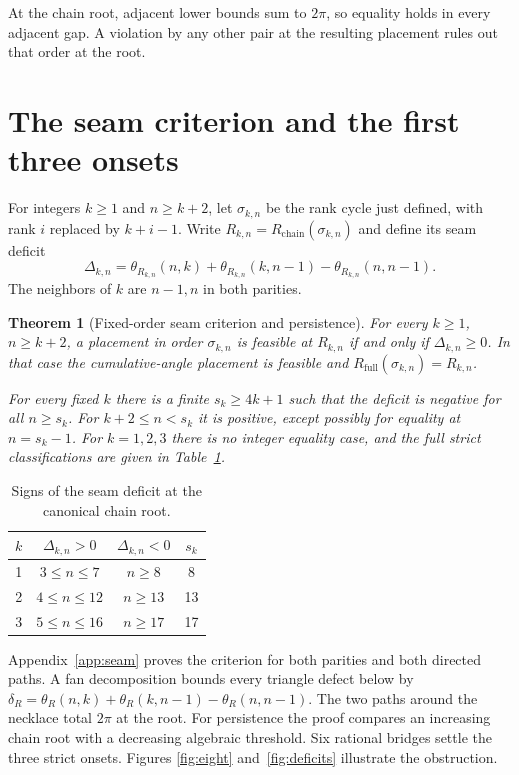 \documentclass[11pt]{article}
\newtheorem{theorem}{Theorem}[section]
\theoremstyle{definition}
\theoremstyle{remark}
\newcommand{\Rchain}{R_{\mathrm{chain}}}
\newcommand{\Rfull}{R_{\mathrm{full}}}
\begin{document}
At the chain root, adjacent lower bounds sum to $2\pi$, so equality holds
in every adjacent gap. A violation by any other pair at the resulting
placement rules out that order at the root.

\section{The seam criterion and the first three onsets}\label{sec:seam}
For integers $k\ge1$ and $n\ge k+2$, let $\sigma_{k,n}$ be the
rank cycle just defined, with rank $i$ replaced by $k+i-1$. Write
$R_{k,n}=\Rchain(\sigma_{k,n})$ and define its seam deficit
\begin{equation}\label{eq:seam-main}
 \Delta_{k,n}=\theta_{R_{k,n}}(n,k)+\theta_{R_{k,n}}(k,n-1)
                    -\theta_{R_{k,n}}(n,n-1).
\end{equation}
The neighbors of $k$ are $n-1,n$ in both parities.

\begin{theorem}[Fixed-order seam criterion and persistence]\label{thm:seam}
For every $k\ge1$, $n\ge k+2$, a placement in order $\sigma_{k,n}$
is feasible at $R_{k,n}$ if and only if $\Delta_{k,n}\ge0$.
In that case the cumulative-angle placement is feasible and
$\Rfull(\sigma_{k,n})=R_{k,n}$.

For every fixed $k$ there is a finite $s_k\ge4k+1$ such that the
deficit is negative for all $n\ge s_k$. For $k+2\le n<s_k$ it is
positive, except possibly for equality at $n=s_k-1$. For $k=1,2,3$
there is no integer equality case, and the full strict classifications
are given in Table~\ref{tab:onsets}.
\end{theorem}

\begin{table}[htbp]\centering
\caption{Signs of the seam deficit at the canonical chain root.}
\label{tab:onsets}
\begin{tabular}{cccc}\toprule
$k$ & $\Delta_{k,n}>0$ & $\Delta_{k,n}<0$ & $s_k$\\\midrule
1 & $3\le n\le7$ & $n\ge8$ & 8\\
2 & $4\le n\le12$ & $n\ge13$ & 13\\
3 & $5\le n\le16$ & $n\ge17$ & 17\\\bottomrule
\end{tabular}
\end{table}

Appendix~\ref{app:seam} proves the criterion for both parities and both
directed paths. A fan decomposition bounds every triangle defect below by
$\delta_R=\theta_R(n,k)+\theta_R(k,n-1)-\theta_R(n,n-1)$.
The two paths around the necklace total $2\pi$ at the root. For persistence
the proof compares an increasing chain root with a decreasing algebraic
threshold. Six rational bridges settle the three strict onsets. Figures
\ref{fig:eight} and~\ref{fig:deficits} illustrate the obstruction.
\end{document}

